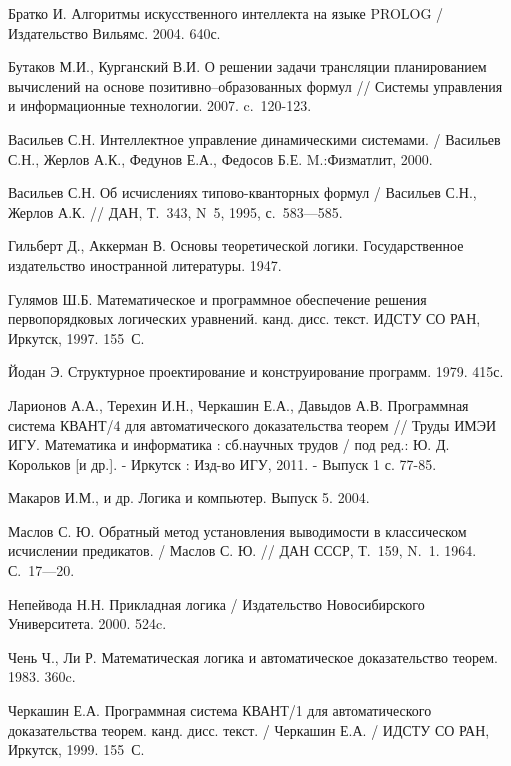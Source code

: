 \begin{thebibliography}{99}

%
%

 Братко И. Алгоритмы искусственного интеллекта на языке PROLOG / Издательство Вильямс. 2004. 640с.

 Бутаков М.И., Курганский В.И. О решении задачи трансляции планированием вычислений на основе позитивно--образованных формул // Системы управления и информационные технологии. 2007. c.~120-123.

 Васильев С.Н. Интеллектное управление динамическими системами. / Васильев С.Н., Жерлов А.К., Федунов Е.А., Федосов Б.Е.  M.:Физматлит, 2000.

 Васильев С.Н. Об исчислениях типово-кванторных формул / Васильев С.Н., Жерлов А.К.  // ДАН, Т.~343, N~5, 1995, с.~583---585.

 Гильберт Д., Аккерман В. Основы теоретической логики. Государственное издательство иностранной литературы. 1947.

 Гулямов Ш.Б. Математическое и программное обеспечение решения первопорядковых логических уравнений. канд. дисс. текст. ИДСТУ СО РАН, Иркутск, 1997. 155~С.

 Йодан Э. Структурное проектирование и конструирование программ. 1979. 415с.

 Ларионов А.А., Терехин И.Н., Черкашин Е.А., Давыдов А.В.
Программная система КВАНТ/4 для автоматического доказательства теорем
// Труды ИМЭИ ИГУ. Математика и информатика : сб.научных трудов / под
ред.: Ю. Д. Корольков [и др.]. - Иркутск : Изд-во ИГУ, 2011. - Выпуск
1 с. 77-85.

 Макаров И.М., и др. Логика и компьютер. Выпуск 5. 2004.

 Маслов С. Ю. Обратный метод установления выводимости в классическом исчислении предикатов. / Маслов С. Ю. // ДАН СССР, Т.~159, N.~1. 1964. С.~17---20.

 Непейвода Н.Н. Прикладная логика / Издательство Новосибирского Университета. 2000. 524c.

 Чень Ч., Ли Р. Математическая логика и автоматическое доказательство теорем. 1983. 360c.

 Черкашин Е.А. Программная система КВАНТ/1 для автоматического доказательства теорем. канд. дисс. текст. / Черкашин Е.А. / ИДСТУ СО РАН, Иркутск, 1999. 155~С.


\end{thebibliography}
